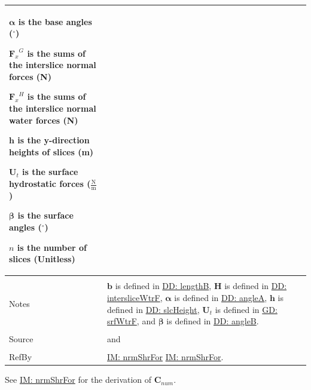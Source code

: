 \documentclass[12pt]{article}
\begin{document}
\begin{minipage}{\textwidth}
\begin{tabular}{p{} p{}}
\begin{symbDescription}
              \item{$\mathbf{α}$ is the base angles (${}^{\circ}$)}
              \item{${{\mathbf{F}_{x}}^{G}}$ is the sums of the interslice normal forces (N)}
              \item{${{\mathbf{F}_{x}}^{H}}$ is the sums of the interslice normal water forces (N)}
              \item{$\mathbf{h}$ is the y-direction heights of slices (m)}
              \item{${\mathbf{U}_{t}}$ is the surface hydrostatic forces ($\frac{\text{N}}{\text{m}}$)}
              \item{$\mathbf{β}$ is the surface angles (${}^{\circ}$)}
              \item{$n$ is the number of slices (Unitless)}
              \end{symbDescription}
\\ \midrule \\
Notes & $\mathbf{b}$ is defined in \hyperref[DD:lengthB]{DD: lengthB}, $\mathbf{H}$ is defined in \hyperref[DD:intersliceWtrF]{DD: intersliceWtrF}, $\mathbf{α}$ is defined in \hyperref[DD:angleA]{DD: angleA}, $\mathbf{h}$ is defined in \hyperref[DD:slcHeight]{DD: slcHeight}, ${\mathbf{U}_{t}}$ is defined in \hyperref[GD:srfWtrF]{GD: srfWtrF}, and $\mathbf{β}$ is defined in \hyperref[DD:angleB]{DD: angleB}.
\\ \midrule \\
Source & \cite{chen2005} and \cite{karchewski2012}
\\ \midrule \\
RefBy & \hyperref[IM:nrmShrFor]{IM: nrmShrFor} \hyperref[IM:nrmShrFor]{IM: nrmShrFor}.
\\ \bottomrule \end{tabular}
\end{minipage}
See \hyperref[IM:nrmShrFor]{IM: nrmShrFor} for the derivation of ${\mathbf{C}_{num}}$.
\par~
\end{document}
